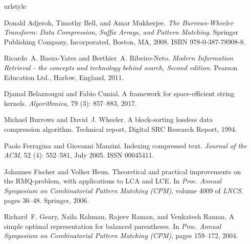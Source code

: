 \documentclass{elsarticle}
\begin{document}
%

\begin{thebibliography}{35}
\providecommand{\natexlab}[1]{#1}
\providecommand{\url}[1]{\texttt{#1}}
\expandafter\ifx\csname urlstyle\endcsname\relax
  \providecommand{\doi}[1]{doi: #1}\else
  \providecommand{\doi}{doi: \begingroup \urlstyle{rm}\Url}\fi

Donald Adjeroh, Timothy Bell, and Amar Mukherjee.
\newblock \emph{The {Burrows-Wheeler} Transform: {Data Compression}, {Suffix
  Arrays}, and {Pattern Matching}}.
\newblock Springer Publishing Company, Incorporated, Boston, MA, 2008.
\newblock ISBN 978-0-387-78908-8.

Ricardo~A. Baeza{-}Yates and Berthier~A. Ribeiro{-}Neto.
\newblock \emph{Modern Information Retrieval - the concepts and technology
  behind search, Second edition}.
\newblock Pearson Education Ltd., Harlow, England, 2011.

Djamal Belazzougui and Fabio Cunial.
\newblock A framework for space-efficient string kernels.
\newblock \emph{Algorithmica}, 79 (3): 857--883, 2017.

Michael Burrows and David~J. Wheeler.
\newblock A block-sorting lossless data compression algorithm.
\newblock Technical report, Digital SRC Research Report, 1994.

Paolo Ferragina and Giovanni Manzini.
\newblock Indexing compressed text.
\newblock \emph{Journal of the ACM}, 52 (4): 552--581, July
  2005.
\newblock ISSN 00045411.

Johannes Fischer and Volker Heun.
\newblock Theoretical and practical improvements on the {RMQ}-problem, with
  applications to {LCA} and {LCE}.
\newblock In \emph{Proc. Annual Symposium on Combinatorial Pattern Matching
  (CPM)}, volume 4009 of \emph{LNCS}, pages 36--48. Springer, 2006.

Richard~F. Geary, Naila Rahman, Rajeev Raman, and Venkatesh Raman.
\newblock A simple optimal representation for balanced parentheses.
\newblock In \emph{Proc. Annual Symposium on Combinatorial Pattern Matching
  (CPM)}, pages 159--172, 2004.


\end{thebibliography}
\end{document}
